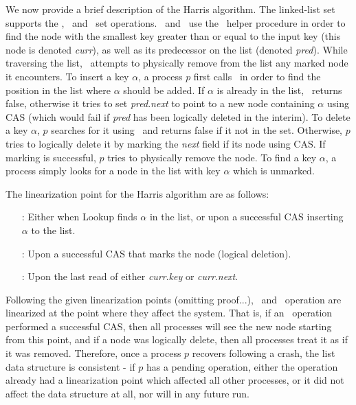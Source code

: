 We now provide a brief description of the Harris algorithm. The linked-list set supports the \find, \insertlst\ and \delete\ set operations. \insertlst\ and \delete\ use the \search\ helper procedure in order to find the node with the smallest key greater than or equal to the input key (this node is denoted \emph{curr}), as well as its predecessor on the list (denoted \emph{pred}). While traversing the list, \search\ attempts to physically remove from the list any marked node it encounters. To insert a key $\alpha$, a process $p$ first calls \search\ in order to find the position in the list where $\alpha$ should be added. If $\alpha$ is already in the list, \insertlst\ returns false, otherwise it tries to set \emph{pred}.\emph{next} to point to a new node containing $\alpha$ using CAS (which would fail if \emph{pred} has been logically deleted in the interim). To delete a key $\alpha$, $p$ searches for it using \search\ and returns false if it not in the set. Otherwise, $p$ tries to logically delete it by marking the \emph{next} field if its node using CAS. If marking is successful, $p$  tries to physically remove the node. To find a key $\alpha$, a process simply looks for a node in the list with key $\alpha$ which is unmarked.

The linearization point for the Harris algorithm are as follows:
\begin{itemize}
	\item [\insertlst:] Either when Lookup finds $\alpha$ in the list, or upon a successful CAS inserting $\alpha$ to the list.
	\item [\delete:] Upon a successful CAS that marks the node (logical deletion).
	\item [\find:] Upon the last read of either \emph{curr}.\emph{key} or \emph{curr}.\emph{next}.
\end{itemize}

Following the given linearization points (omitting proof...), \insertlst\ and \delete\ operation are linearized at the point where they affect the system. That is, if an \insertlst\ operation performed a successful CAS, then all processes will see the new node starting from this point, and if a node was logically delete, then all processes treat it as if it was removed. Therefore, once a process $p$ recovers following a crash, the list data structure is consistent - if $p$ has a pending operation, either the operation already had a linearization point which affected all other processes, or it did not affect the data structure at all, nor will in any future run.

